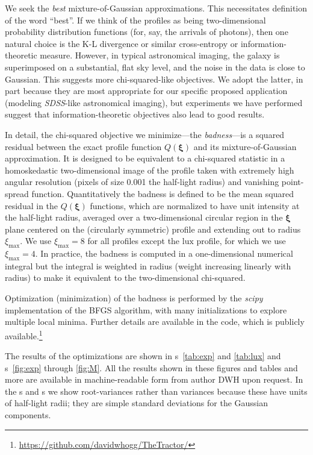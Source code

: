 \documentclass[12pt,pdftex,preprint]{aastex}
\newcommand{\project}[1]{\textsl{#1}}
\newcommand{\sdss}{\project{SDSS}}
\newcommand{\tvector}[1]{\boldsymbol{#1}}
\newcommand{\spos}{\tvector{\xi}}
\newcommand{\lux}{\mathrm{lux}}
\begin{document}
We seek the \emph{best} mixture-of-Gaussian approximations.  This
necessitates definition of the word ``best''.  If we think of the
profiles as being two-dimensional probability distribution functions
(for, say, the arrivals of photons), then one natural choice is the
K-L divergence or similar cross-entropy or information-theoretic
measure.  However, in typical astronomical imaging, the galaxy is
superimposed on a substantial, flat sky level, and the noise in the
data is close to Gaussian.  This suggests more chi-squared-like
objectives.  We adopt the latter, in part because they are most
appropriate for our specific proposed application (modeling \sdss-like
astronomical imaging), but experiments we have performed suggest that
information-theoretic objectives also lead to good results.

In detail, the chi-squared objective we minimize---the
\emph{badness}---is a squared residual between the exact profile
function $Q(\spos)$ and its mixture-of-Gaussian approximation.  It is
designed to be equivalent to a chi-squared statistic in a
homoskedastic two-dimensional image of the profile taken with
extremely high angular resolution (pixels of size 0.001 the half-light
radius) and vanishing point-spread function.  Quantitatively the
badness is defined to be the mean squared residual in the $Q(\spos)$
functions, which are normalized to have unit intensity at the
half-light radius, averaged over a two-dimensional circular region in
the $\spos$ plane centered on the (circularly symmetric) profile and
extending out to radius $\xi_{\max}$.  We use $\xi_{\max}=8$ for all
profiles except the $\lux$ profile, for which we use $\xi_{\max}=4$.
In practice, the badness is computed in a one-dimensional numerical
integral but the integral is weighted in radius (weight increasing
linearly with radius) to make it equivalent to the two-dimensional
chi-squared.

Optimization (minimization) of the badness is performed by the
\project{scipy} implementation of the BFGS algorithm, with many
initializations to explore multiple local minima.  Further details are
available in the code, which is publicly
available.\footnote{\url{https://github.com/davidwhogg/TheTractor/}}

The results of the optimizations are shown in \tablename
s~\ref{tab:exp} and \ref{tab:lux} and \figurename s~\ref{fig:exp}
through \ref{fig:M}.  All the results shown in these figures and
tables and more are available in machine-readable form from author DWH
upon request.  In the \tablename s and \figurename s we show
root-variances rather than variances because these have units of
half-light radii; they are simple standard deviations for the Gaussian
components.
\end{document}

